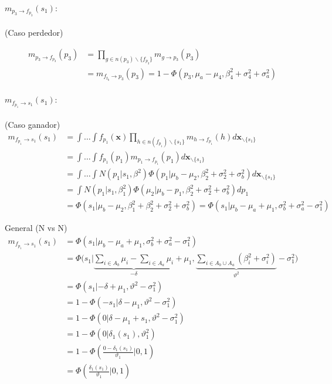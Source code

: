 \documentclass[11pt,twoside,spanish]{report} %
\begin{document}
\paragraph{$m_{p_3 \rightarrow f_{p_3}}(s_1):$} (Caso perdedor)

\begin{equation}
	\begin{split}
		m_{p_3 \rightarrow f_{p_3}}(p_3) &= \prod_{g \in n(p_3) \backslash  \{f_{p_3} \}} m_{g \rightarrow p_3} (p_3) \\
		&= m_{f_{t_b} \rightarrow p_3}(p_3)=  1 - \Phi(p_3, \mu_a  - \mu_4, \beta_4^2 + \sigma_4^2 + \sigma_a^2)
	\end{split}
\end{equation}

\paragraph{$m_{f_{p_1} \rightarrow s_1}(s_1):$} (Caso ganador)
\begin{equation}
	\begin{split}
		m_{f_{p_1} \rightarrow s_1}(s_1) & = \int \dots \int f_{p_1}(\textbf{x}) \prod_{h \in n(f_{p_1}) \backslash \{s_1\} } m_{h \rightarrow f_{p_1}}(h)  d\textbf{x}_{\backslash \{s_1\} }  \\
		&= \int \dots \int f_{p_1}(p_1)m_{p_1 \rightarrow f_{p_1}}(p_1) d\textbf{x}_{\backslash \{s_1\} }  \\
		&= \int \dots \int N(p_1| s_1, \beta^2)  \Phi(p_1| \mu_b - \mu_2, \beta_2^2 + \sigma_2^2 + \sigma_b^2 )  d\textbf{x}_{\backslash \{s_1\} }\\
		&= \int N(p_1| s_1, \beta_1^2)  \Phi(\mu_2| \mu_b -  p_1, \beta_2^2 + \sigma_2^2 + \sigma_b^2)  dp_1 \\
		&= \Phi(s_1| \mu_b - \mu_2, \beta_1^2+\beta_2^2 + \sigma_2^2 + \sigma_b^2) =\Phi(s_1| \mu_b - \mu_a + \mu_1, \sigma_b^2 +\sigma_a^2 - \sigma_1^2 )
	\end{split}
\end{equation}

General (N vs N)
\begin{equation}
	\begin{split}
		m_{f_{p_1} \rightarrow s_1}(s_1) & = \Phi(s_1| \mu_b - \mu_a + \mu_1, \sigma_b^2 +\sigma_a^2 - \sigma_1^2 )  \\
		& = \Phi\Big(s_1| \underbrace{\sum_{i \in A_b} \mu_i - \sum_{i \in A_a} \mu_i} _{ -\delta}  + \mu_1 , \underbrace{\sum_{i \in A_b \cup A_a} (\beta_i^2 + \sigma_i^2)}_{\vartheta^2} - \sigma_1^2 \Big) \\
		& = \Phi(s_1|-\delta + \mu_1,\vartheta^2-\sigma_1^2) \\
		& = 1- \Phi(-s_1|\delta - \mu_1 ,\vartheta^2-\sigma_1^2) \\
		& = 1- \Phi(0|\delta - \mu_1 + s_1 ,\vartheta^2-\sigma_1^2) \\
		& = 1- \Phi(0|\delta_1(s_1),\vartheta_1^2) \\
		&= 1- \Phi\left(\frac{0-\delta_1(s_1)}{\vartheta_1}|0,1\right)\\
		&= \Phi\left(\frac{\delta_1(s_1)}{\vartheta_1}|0,1\right)
	\end{split}
\end{equation}
\end{document}
